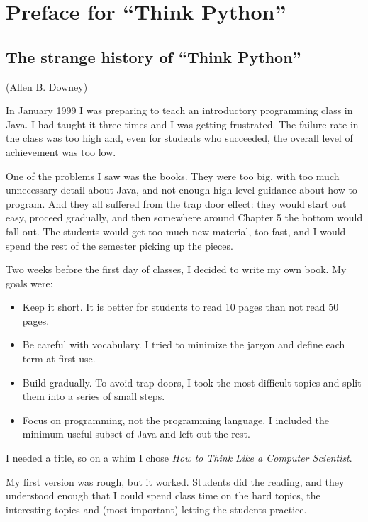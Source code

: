 \documentclass[10pt]{book}
\begin{document}
\section*{Preface for ``Think Python''}

\subsection*{The strange history of ``Think Python''}

(Allen B. Downey)

In January 1999 I was preparing to teach an introductory programming
class in Java.  I had taught it three times and I was getting
frustrated.  The failure rate in the class was too high and, even for
students who succeeded, the overall level of achievement was too low.

One of the problems I saw was the books.  
They were too big, with too much unnecessary detail about Java, and
not enough high-level guidance about how to program.  And they all
suffered from the trap door effect: they would start out easy,
proceed gradually, and then somewhere around Chapter 5 the bottom would
fall out.  The students would get too much new material, too fast,
and I would spend the rest of the semester picking up the pieces.

Two weeks before the first day of classes, I decided to write my
own book.  
My goals were:

\begin{itemize}

\item Keep it short.  It is better for students to read 10 pages
than not read 50 pages.

\item Be careful with vocabulary.  I tried to minimize the jargon
and define each term at first use.

\item Build gradually. To avoid trap doors, I took the most difficult
topics and split them into a series of small steps. 

\item Focus on programming, not the programming language.  I included
the minimum useful subset of Java and left out the rest.

\end{itemize}

I needed a title, so on a whim I chose \emph{How to Think Like
a Computer Scientist}.

My first version was rough, but it worked.  Students did the reading,
and they understood enough that I could spend class time on the hard
topics, the interesting topics and (most important) letting the
students practice.
\end{document}
